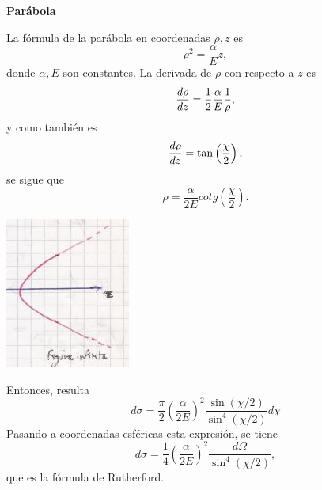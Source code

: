 \documentclass[10pt,oneside]{CBFT_book}
\begin{document}
\begin{ejemplo}{\bf Parábola}

La fórmula de la parábola en coordenadas $\rho,z$ es
\[
	\rho^2 = \frac{\alpha}{E} z,
\]
donde $\alpha, E$ son constantes. La derivada de $\rho$ con respecto a $z$ es
\[
	\frac{d^{\hspace{-0.05em}} {\rho}}{d {z}^{\hspace{-0.05em}}} = \frac{1}{2} \frac{\alpha}{E} \frac{1}{\rho},
\]
y como también es
\[
	\frac{d^{\hspace{-0.05em}} {\rho}}{d {z}^{\hspace{-0.05em}}} = \tan \left( \frac{\chi}{2} \right),
\]
se sigue que 
\[
	\rho = \frac{ \alpha }{2E} cotg \left( \frac{\chi}{2} \right).
\]

\includegraphics[scale=0.5]{images/fig_mc_dispersion_parabola.jpg} 

Entonces, resulta 
\[
	d\sigma = \frac{\pi}{2} \left( \frac{\alpha}{2E} \right)^2
	\frac{ \sin (\chi/2) }{ \sin^4 (\chi/2) } d\chi
\]
Pasando a coordenadas esféricas esta expresión, se tiene 
\[
	d\sigma = \frac{1}{4} \left( \frac{\alpha}{2E} \right)^2
	\frac{ d\Omega }{ \sin^4 (\chi/2) },
\]
que es la fórmula de Rutherford.
\end{ejemplo}
\end{document}
